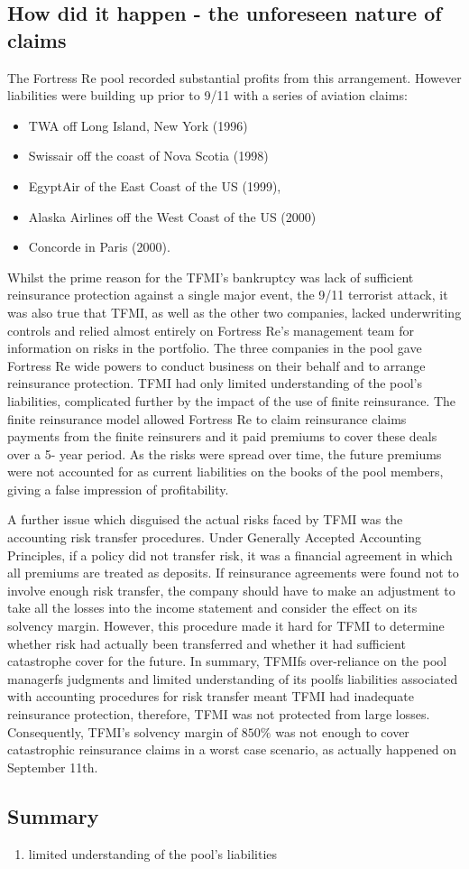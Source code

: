 \documentclass[12pt, a4paper]{report}
\begin{document}
\subsection{How did it happen - the unforeseen nature of claims} The
Fortress Re pool recorded substantial profits from this
arrangement. However liabilities were building up prior to 9/11
with a series of aviation claims: \begin{itemize} \item TWA off
Long Island, New York (1996)\item Swissair off the coast of Nova
Scotia (1998)\item EgyptAir of the East Coast of the US (1999),
\item Alaska Airlines off the West Coast of the US (2000) \item
Concorde in Paris (2000). \end{itemize}Whilst the prime reason for
the TFMI's bankruptcy was lack of sufficient reinsurance
protection against a single major event, the 9/11 terrorist
attack, it was also true that TFMI, as well as the other two
companies, lacked underwriting controls and relied almost entirely
on Fortress Re's management team for information on risks in the
portfolio. The three companies in the pool gave Fortress Re wide
powers to conduct business on their behalf and to arrange
reinsurance protection. TFMI had only limited understanding of the
pool's liabilities, complicated further by the impact of the use
of finite reinsurance. \noindent The finite reinsurance model
allowed Fortress Re to claim reinsurance claims payments from the
finite reinsurers and it paid premiums to cover these deals over a
5- year period. As the risks were spread over time, the future
premiums were not accounted for as current liabilities on the
books of the pool members, giving a false impression of
profitability.

\noindent A further issue which disguised the actual risks faced
by TFMI was the accounting risk transfer procedures. Under
Generally Accepted Accounting Principles, if a policy did not
transfer risk, it was a financial agreement in which all premiums
are treated as deposits. If reinsurance agreements were found not
to involve enough risk transfer, the company should have to make
an adjustment to take all the losses into the income statement and
consider the effect on its solvency margin. However, this
procedure made it hard for TFMI to determine whether risk had
actually been transferred and whether it had sufficient
catastrophe cover for the future. In summary, TFMIfs
over-reliance on the pool managerfs judgments and limited
understanding of its poolfs liabilities associated with
accounting procedures for risk transfer meant TFMI had inadequate
reinsurance protection, therefore, TFMI was not protected from
large losses. Consequently, TFMI's solvency margin of $850\%$ was
not enough to cover catastrophic reinsurance claims in a worst
case scenario, as actually happened on September 11th.


\subsection{Summary}
\begin{enumerate}
\item limited understanding of the pool's liabilities
\end{enumerate}


\newpage
\end{document}
